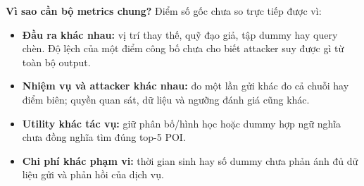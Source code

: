 \textbf{Vì sao cần bộ metrics chung?} Điểm số gốc chưa so trực tiếp được vì:

\begin{itemize}
\item \textbf{Đầu ra khác nhau:} vị trí thay thế, quỹ đạo giả, tập dummy hay query chèn. Độ lệch của một điểm công bố chưa cho biết attacker suy được gì từ toàn bộ output.
\item \textbf{Nhiệm vụ và attacker khác nhau:} đo một lần gửi khác đo cả chuỗi hay điểm biên; quyền quan sát, dữ liệu và ngưỡng đánh giá cũng khác.
\item \textbf{Utility khác tác vụ:} giữ phân bố/hình học hoặc dummy hợp ngữ nghĩa chưa đồng nghĩa tìm đúng top-5 POI.
\item \textbf{Chi phí khác phạm vi:} thời gian sinh hay số dummy chưa phản ánh đủ dữ liệu gửi và phản hồi của dịch vụ.
\end{itemize}

